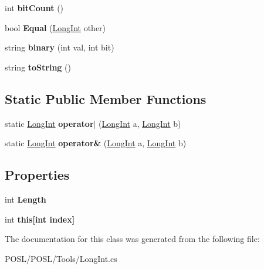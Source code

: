 \begin{DoxyCompactItemize}
\item 
\mbox{\label{classPOSL_1_1Tools_1_1LongInt_a5249a8142bf430fb034e10d953e1cdb7}} 
int {\bfseries bit\+Count} ()
\item 
\mbox{\label{classPOSL_1_1Tools_1_1LongInt_a20d07c89e9e5c1b43adb7ef595df9ba2}} 
bool {\bfseries Equal} (\hyperlink{classPOSL_1_1Tools_1_1LongInt}{Long\+Int} other)
\item 
\mbox{\label{classPOSL_1_1Tools_1_1LongInt_a549c0bf554df2994e3d02048efc306f1}} 
string {\bfseries binary} (int val, int bit)
\item 
\mbox{\label{classPOSL_1_1Tools_1_1LongInt_ae71c42d1e8c99aac66089ddf039133c7}} 
string {\bfseries to\+String} ()
\end{DoxyCompactItemize}
\subsection*{Static Public Member Functions}
\begin{DoxyCompactItemize}
\item 
\mbox{\label{classPOSL_1_1Tools_1_1LongInt_a59a05285b8a0ac2b680989e8a49e7db7}} 
static \hyperlink{classPOSL_1_1Tools_1_1LongInt}{Long\+Int} {\bfseries operator$\vert$} (\hyperlink{classPOSL_1_1Tools_1_1LongInt}{Long\+Int} a, \hyperlink{classPOSL_1_1Tools_1_1LongInt}{Long\+Int} b)
\item 
\mbox{\label{classPOSL_1_1Tools_1_1LongInt_a9a85a5d9acbdb9b96cbdfcb479c787ed}} 
static \hyperlink{classPOSL_1_1Tools_1_1LongInt}{Long\+Int} {\bfseries operator\&} (\hyperlink{classPOSL_1_1Tools_1_1LongInt}{Long\+Int} a, \hyperlink{classPOSL_1_1Tools_1_1LongInt}{Long\+Int} b)
\end{DoxyCompactItemize}
\subsection*{Properties}
\begin{DoxyCompactItemize}
\item 
\mbox{\label{classPOSL_1_1Tools_1_1LongInt_a9fa7492f38b945f25e677400cd30cb53}} 
int {\bfseries Length}
\item 
\mbox{\label{classPOSL_1_1Tools_1_1LongInt_a1aa896fb7636d73971a58c8a673675b0}} 
int {\bfseries this\mbox{[}int index\mbox{]}}
\end{DoxyCompactItemize}


The documentation for this class was generated from the following file\+:\begin{DoxyCompactItemize}
\item 
P\+O\+S\+L/\+P\+O\+S\+L/\+Tools/Long\+Int.\+cs\end{DoxyCompactItemize}
